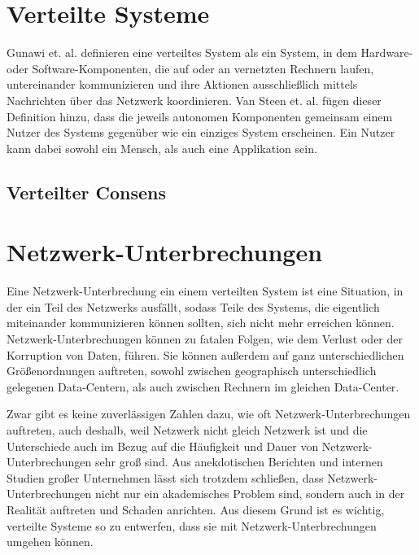 \documentclass[12pt,a4paper]{report}
\begin{document}
\section{Verteilte Systeme}
Gunawi et. al. \cite{distributed_systems_concepts_and_design} definieren eine verteiltes System als ein System, in dem Hardware-
oder Software-Komponenten, die auf oder an vernetzten Rechnern laufen, untereinander kommunizieren und ihre Aktionen
ausschließlich mittels Nachrichten über das Netzwerk koordinieren. Van Steen et. al.
\cite{brief_introduction_to_distributed_systems} fügen dieser Definition hinzu, dass die jeweils autonomen Komponenten gemeinsam
einem Nutzer des Systems gegenüber wie ein einziges System erscheinen. Ein Nutzer kann dabei sowohl ein Mensch, als auch eine
Applikation sein.

\cite{cloud_virtualization}

\subsection{Verteilter Consens}
\cite{raft_original_paper}

\section{Netzwerk-Unterbrechungen}
Eine Netzwerk-Unterbrechung ein einem verteilten System ist eine Situation, in der ein Teil des Netzwerks ausfällt, sodass Teile
des Systems, die eigentlich miteinander kommunizieren können sollten, sich nicht mehr erreichen können. Netzwerk-Unterbrechungen
können zu fatalen Folgen, wie dem Verlust oder der Korruption von Daten, führen. Sie können außerdem auf ganz unterschiedlichen
Größenordnungen auftreten, sowohl zwischen geographisch unterschiedlich gelegenen Data-Centern, als auch zwischen Rechnern im
gleichen Data-Center. \cite{analysis_of_network_partition_failures}

Zwar gibt es keine zuverlässigen Zahlen dazu, wie oft Netzwerk-Unterbrechungen auftreten, auch deshalb, weil Netzwerk nicht gleich
Netzwerk ist und die Unterschiede auch im Bezug auf die Häufigkeit und Dauer von Netzwerk-Unterbrechungen sehr groß sind. Aus
anekdotischen Berichten und internen Studien großer Unternehmen lässt sich trotzdem schließen, dass Netzwerk-Unterbrechungen nicht
nur ein akademisches Problem sind, sondern auch in der Realität auftreten und Schaden anrichten. Aus diesem Grund ist es wichtig,
verteilte Systeme so zu entwerfen, dass sie mit Netzwerk-Unterbrechungen umgehen können. \cite{the_network_is_reliable}
\end{document}
